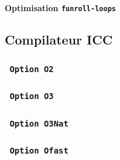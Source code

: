 \documentclass{report}
\begin{document}
	      \paragraph{Optimisation \texttt{funroll-loops}}
      
      \subsection{Compilateur ICC}
      \subsubsection{ \texttt{ Option O2 } }
      \subsubsection{ \texttt{ Option O3 }  }
      \subsubsection{ \texttt{ Option O3Nat} }
      \subsubsection{ \texttt{ Option Ofast } }
      
 
\end{document}
